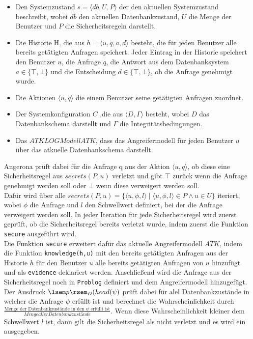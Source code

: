 \documentclass[german,version-2020-11]{uzl-thesis}
\begin{document}
\begin{itemize}
	\item Den Systemzustand $s=\langle db,U,P\rangle $ der den aktuellen Systemzustand beschreibt, wobei $db$ den aktuellen Datenbankzustand, $U$ die Menge der Benutzer und $P$ die Sicherheitsregeln darstellt.
	\item Die Historie H, die aus $h=\langle u,q,a,d \rangle$ besteht, die für jeden Benutzer alle bereits getätigten Anfragen speichert. Jeder Eintrag in der Historie speichert den Benutzer $u$, die Anfrage $q$, die Antwort aus dem Datenbanksystem $a \in \{\top, \bot \}$ und die Entscheidung $d \in \{\top, \bot \}$, ob die Anfrage genehmigt wurde.
	\item Die Aktionen $\langle u,q \rangle$ die einem Benutzer seine getätigten Anfragen zuordnet.
	\item Der Systemkonfiguration $C$ ,die aus $\langle D,\Gamma \rangle$ besteht, wobei $D$  das Datenbankschema darstellt und $\Gamma$ die Integritätsbedingungen. 
	\item  Das $ATKLOG Modell ATK$, dass das Angreifermodell für jeden Benutzer $u$ über das atkuelle Datenbankschema darstellt.
\end{itemize}
Angerona prüft dabei für die Anfrage q aus der Aktion $\langle u,q \rangle$, ob diese eine Sicherheitsregel aus $secrets(P,u)$ verletzt und gibt $\top$ zurück wenn die Anfrage genehmigt werden soll oder $\bot$ wenn diese verweigert werden soll. \\ 
Dafür wird über alle  $secrets(P,u) = \{ \langle u,\phi,l \rangle \mid \langle u,\phi,l \rangle \in P \land u \in U\}$ iteriert, wobei $\phi$ die Anfrage und $l$ den Schwellwert definiert, bei der die Anfrage verweigert werden soll. In jeder Iteration für jede Sicherheitsregel wird zuerst geprüft, ob die Sicherheitsregel bereits verletzt wurde, indem zuerst die Funktion \texttt{secure} ausgeführt wird. \\ 
Die Funktion \texttt{secure} erweitert dafür das aktuelle Angreifermodell $ATK$, indem die  Funktion \texttt{knowledge(h,u)} mit den bereits getätigten Anfragen aus der Historie $h$ für den Benutzer $u$ alle bereits getätigten Anfragen von $u$ hinzufügt und als  \texttt{evidence} deklariert werden. Anschließend wird die Anfrage aus der Sicherheitsregel noch in \texttt{Problog} definiert und dem Angreifermodell hinzugefügt. Der Ausdruck $\lsem p \rsem_D (head(\psi)$ prüft dabei für alel Datenbankzustände in welcher die Anfrage $\psi$ erfüllt ist und berechnet die Wahrscheinlichkeit durch $\frac{\text{Menge der Datenbankzustände in den $\psi$ erfüllt ist}}{Menge aller Datenbankzustände}$. Wenn diese Wahrscheinlichkeit kleiner dem Schwellwert $l$ ist, dann gilt die Sicherheitsregel als nicht verletzt und es wird ein \top ausgegeben. \\ 
\end{document}
